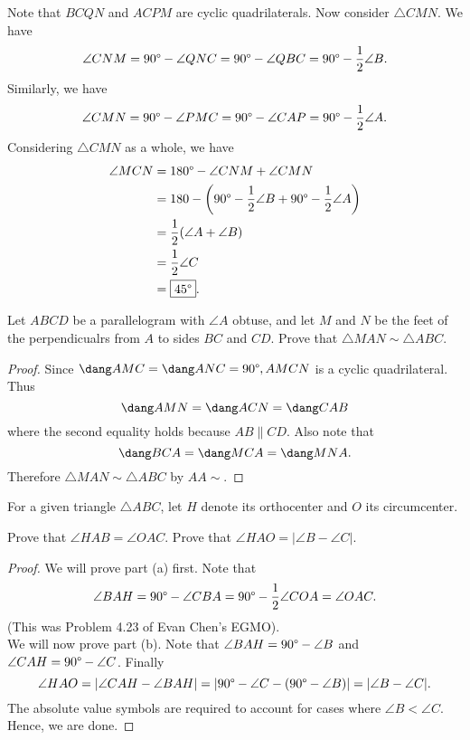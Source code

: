 \documentclass[letterpaper,oneside]{scrartcl}
\begin{document}
\begin{soln}
  Note that \(BCQN\) and \(ACPM\) are cyclic quadrilaterals. Now consider \(\triangle CMN\). We have
  \[\angle CNM = 90\degree - \angle QNC = 90\degree - \angle QBC = 90\degree - \frac12\angle B.\]
  Similarly, we have
  \[\angle CMN = 90\degree - \angle PMC = 90\degree - \angle CAP = 90\degree - \frac12\angle A.\]
  Considering \(\triangle CMN\) as a whole, we have
  \begin{align*}
    \angle MCN & = 180\degree - \angle CNM + \angle CMN                                        \\
               & = 180- \left(90\degree - \frac12\angle B + 90\degree - \frac12\angle A\right) \\
               & = \frac12(\angle A + \angle B)                                                \\
               & = \frac12\angle C                                                             \\
               & = \fbox{\(45\degree\)}.
  \end{align*}
\end{soln}
\begin{problem*}
  Let \(ABCD\) be a parallelogram with \(\angle A\) obtuse, and let \(M\) and \(N\) be the feet of the perpendicualrs from \(A\) to sides \(BC\) and \(CD\). Prove that \(\triangle MAN \sim \triangle ABC\).
\end{problem*}
\begin{proof}
  Since \(\dang AMC = \dang ANC = 90\degree, AMCN\) is a cyclic quadrilateral. Thus
  \[\dang AMN = \dang ACN = \dang CAB\]
  where the second equality holds because \(AB \parallel CD\). Also note that
  \[\dang BCA = \dang MCA = \dang MNA.\]
  Therefore \(\triangle MAN \sim \triangle ABC\) by \(AA\sim\).
\end{proof}
\begin{problem*}
  For a given triangle \(\triangle ABC\), let \(H\) denote its orthocenter and \(O\) its circumcenter.
  \begin{enumerate}
    \ii[(a)] Prove that \(\angle HAB = \angle OAC\).
    \ii[(b)] Prove that \(\angle HAO = |\angle B - \angle C|\).
  \end{enumerate}
\end{problem*}
\begin{proof}
  We will prove part (a) first. Note that
  \[\angle BAH = 90\degree - \angle CBA = 90\degree - \frac12 \angle COA = \angle OAC.\]
  (This was Problem 4.23 of Evan Chen's EGMO).\\
  We will now prove part (b). Note that \(\angle BAH = 90\degree - \angle B\) and \(\angle CAH = 90\degree - \angle C\). Finally
  \[\angle HAO = |\angle CAH - \angle BAH| = |90\degree - \angle C - (90 \degree - \angle B)| = |\angle B - \angle C|.\]
  The absolute value symbols are required to account for cases where \(\angle B < \angle C\). Hence, we are done.
\end{proof}
\end{document}
